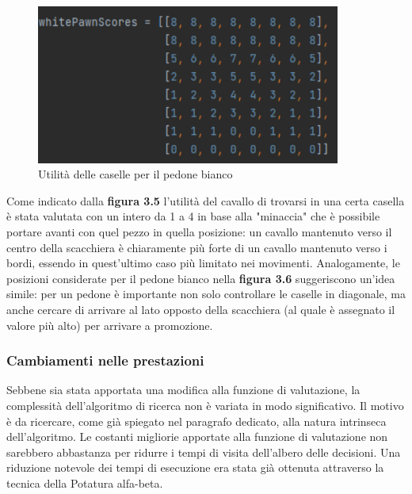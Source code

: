 \begin{figure}[!htb]
    \includegraphics[width=10cm]{frontmatter/figure/pedone.pdf}
    \centering
    \caption{Utilità delle caselle per il pedone bianco}
    \label{fig:valore_pezzi}
\end{figure}
Come indicato dalla \textbf{figura 3.5} l'utilità del cavallo di trovarsi in una certa casella è stata valutata con un intero da 1 a 4 in base alla "minaccia" che è possibile portare avanti con quel pezzo in quella posizione: un cavallo mantenuto verso il centro della scacchiera è chiaramente più forte di un cavallo mantenuto verso i bordi, essendo in quest'ultimo caso più limitato nei movimenti. Analogamente, le posizioni considerate per il pedone bianco nella \textbf{figura 3.6} suggeriscono un'idea simile: per un pedone è importante non solo controllare le caselle in diagonale, ma anche cercare di arrivare al lato opposto della scacchiera (al quale è assegnato il valore più alto) per arrivare a promozione. 

\subsubsection{Cambiamenti nelle prestazioni}
Sebbene sia stata apportata una modifica alla funzione di valutazione, la complessità dell'algoritmo di ricerca non è variata in modo significativo. Il motivo è da ricercare, come già spiegato nel paragrafo dedicato, alla natura intrinseca dell'algoritmo. Le costanti migliorie apportate alla funzione di valutazione non sarebbero abbastanza per ridurre i tempi di visita dell'albero delle decisioni. Una riduzione notevole dei tempi di esecuzione era stata già ottenuta attraverso la tecnica della Potatura alfa-beta.


